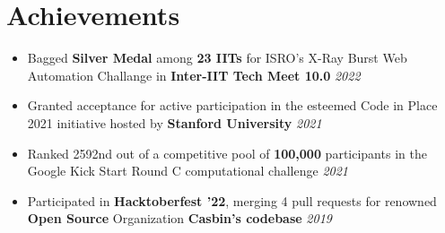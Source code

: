 \section*{\sc Achievements}
\vspace{-2mm}
\hrulefill
\vspace{1mm}

\begin{itemize}
 \item Bagged \textbf{Silver Medal} among \textbf{23 IITs} for ISRO's X-Ray Burst Web Automation Challange in \textbf{Inter-IIT Tech Meet 10.0} \hfill \textit{2022} 
 \item Granted acceptance for active participation in the esteemed Code in Place 2021 initiative hosted by \textbf{Stanford University} \hfill \textit{2021}
 \item Ranked 2592nd out of a competitive pool of \textbf{100,000} participants in the Google Kick Start Round C computational challenge  \hfill \textit{2021}
 \item Participated in \textbf{Hacktoberfest ’22}, merging 4 pull requests for renowned \textbf{Open Source} Organization \textbf{Casbin’s codebase}  \hfill \textit{2019}
\end{itemize}
